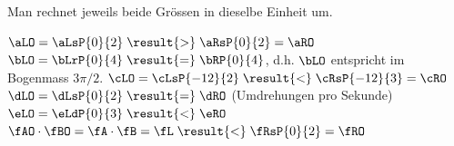 Man rechnet jeweils beide Grössen in dieselbe Einheit um.
\begin{abcliste}
\abc $\aLO = \aLsP{0}{2} \;\result{>}\; \aRsP{0}{2} = \aRO$
\abc $\bLO = \bLrP{0}{4} \;\result{=}\; \bRP{0}{4}$, d.h. $\bLO$ entspricht im Bogenmass $3\pi/2$.
\abc $\cLO = \cLsP{-12}{2} \;\result{<}\; \cRsP{-12}{3} = \cRO$
\abc $\dLO = \dLsP{0}{2} \;\result{=}\; \dRO$ (Umdrehungen pro Sekunde)
\abc $\eLO = \eLdP{0}{3} \;\result{<}\; \eRO$
\abc $\fAO\cdot\fBO = \fA\cdot\fB = \fL \;\result{<}\; \fRsP{0}{2} = \fRO$
\end{abcliste}
